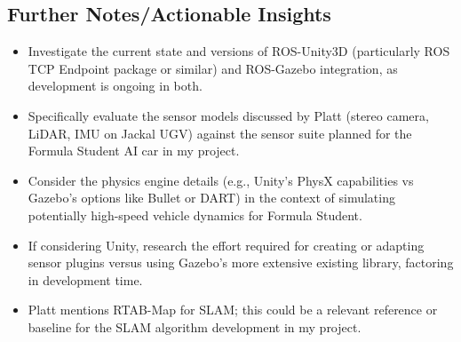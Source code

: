 \subsection{Further Notes/Actionable Insights}\label{subsec:further-notes/actionable-insights}
\begin{itemize}
    \item Investigate the current state and versions of ROS-Unity3D (particularly ROS TCP Endpoint package or similar) and ROS-Gazebo integration, as development is ongoing in both.
    \item Specifically evaluate the sensor models discussed by Platt (stereo camera, LiDAR, IMU on Jackal UGV) against the sensor suite planned for the Formula Student AI car in my project.
    \item Consider the physics engine details (e.g., Unity's PhysX capabilities vs Gazebo's options like Bullet or DART) in the context of simulating potentially high-speed vehicle dynamics for Formula Student.
    \item If considering Unity, research the effort required for creating or adapting sensor plugins versus using Gazebo's more extensive existing library, factoring in development time.
    \item Platt mentions RTAB-Map for SLAM; this could be a relevant reference or baseline for the SLAM algorithm development in my project.
\end{itemize}